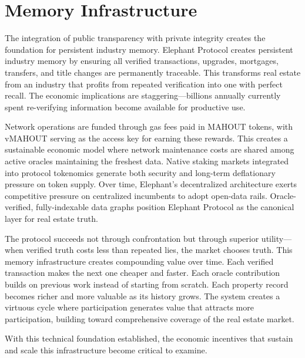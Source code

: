 \section{Memory Infrastructure}

The integration of public transparency with private integrity creates the foundation for persistent industry memory. Elephant Protocol creates persistent industry memory by ensuring all verified transactions, upgrades, mortgages, transfers, and title changes are permanently traceable. This transforms real estate from an industry that profits from repeated verification into one with perfect recall. The economic implications are staggering---billions annually currently spent re-verifying information become available for productive use.

Network operations are funded through gas fees paid in MAHOUT tokens, with vMAHOUT serving as the access key for earning these rewards. This creates a sustainable economic model where network maintenance costs are shared among active oracles maintaining the freshest data. Native staking markets integrated into protocol tokenomics generate both security and long-term deflationary pressure on token supply. Over time, Elephant's decentralized architecture exerts competitive pressure on centralized incumbents to adopt open-data rails. Oracle-verified, fully-indexable data graphs position Elephant Protocol as the canonical layer for real estate truth.

The protocol succeeds not through confrontation but through superior utility---when verified truth costs less than repeated lies, the market chooses truth. This memory infrastructure creates compounding value over time. Each verified transaction makes the next one cheaper and faster. Each oracle contribution builds on previous work instead of starting from scratch. Each property record becomes richer and more valuable as its history grows. The system creates a virtuous cycle where participation generates value that attracts more participation, building toward comprehensive coverage of the real estate market.

With this technical foundation established, the economic incentives that sustain and scale this infrastructure become critical to examine.